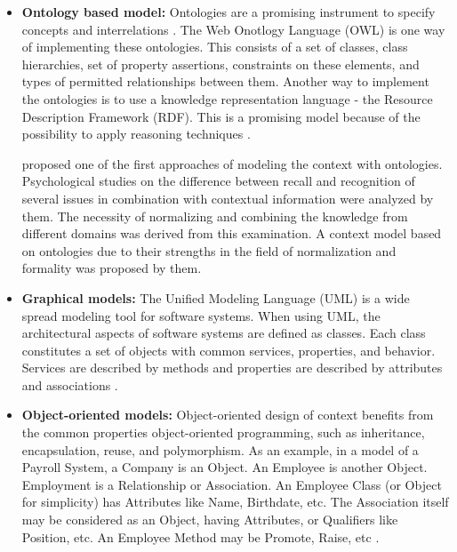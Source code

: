 \begin{itemize}
\item \textbf{Ontology based model: }
Ontologies are a promising instrument to specify concepts and interrelations \cite{gruber_1993}. The Web Onotlogy Language (OWL) is one way of implementing these ontologies. This consists of a set of classes, class hierarchies, set of property assertions, constraints on these elements, and types of permitted relationships between them. Another way to implement the ontologies is to use a knowledge representation language - the Resource Description Framework (RDF). This is a promising model because of the possibility to apply reasoning techniques \cite{Riva04}.  

\citeauthor{Oeztuerk97towardsa} proposed one of the first approaches of modeling the context with ontologies. Psychological studies on the difference between recall and recognition of several issues in combination with contextual information were analyzed by them. The necessity of normalizing and combining the knowledge from different domains was derived from this examination. A context model based on ontologies due to their strengths in the field of normalization and formality was proposed by them.

\item \textbf{Graphical models:} 
The Unified Modeling Language (UML) is a wide spread modeling tool for software systems. When using UML, the architectural aspects of software systems are defined as classes. Each class constitutes a set of objects with common services, properties, and behavior. Services are described by methods and properties are described by attributes and associations \cite{Sheng2005}.



\item \textbf{Object-oriented models:} Object-oriented design of context benefits from the common properties object-oriented programming, such as inheritance, encapsulation, reuse, and polymorphism. As an example, in a model of a Payroll System, a Company is an Object. An Employee is another Object. Employment is a Relationship or Association. An Employee Class (or Object for simplicity) has Attributes like Name, Birthdate, etc. The Association itself may be considered as an Object, having Attributes, or Qualifiers like Position, etc. An Employee Method may be Promote, Raise, etc \cite{wiki:Object-oriented_modeling}.


\end{itemize}
